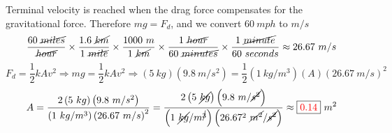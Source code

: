 \documentclass{article}
\begin{document}
\noindent
Terminal velocity is reached when the drag force compensates for the gravitational force. Therefore $mg=F_d$, and we convert $60 \ mph$ to $m/s$
	\[ \frac{60 \ \cancel{miles}}{ \cancel{hour}} \times \frac{1.6 \ \cancel{km}}{1 \ \cancel{mile}} \times \frac{1000 \ m}{1 \ \cancel{km}} \times \frac{1 \ \cancel{hour}}{60 \ \cancel{minutes}} \times \frac{1 \  \cancel{minute}}{60 \ seconds} \approx 26.67 \ m/s \]
	\[ F_d = \frac{1}{2} kAv^2 \Rightarrow mg = \frac{1}{2} kAv^2 \Rightarrow \left(5 \ kg \right) \left(9.8 \ m/s^2 \right) = \frac{1}{2} \left( 1 \ kg/m^3 \right) \left( A \right) {\left(26.67 \ m/s \right)}^2 \]
	\[ A = \frac{2 \left(5 \ kg \right) \left(9.8 \ m/s^2 \right)}{\left( 1 \ kg/m^3 \right)  {\left(26.67 \ m/s \right)}^2 } = \frac{2 \left(5 \ \cancel{kg} \right) \left(9.8 \ m/\cancel{s^2} \right)}{\left( 1 \ \cancel{kg}/m^{\cancel{3}} \right)  \left(26.67^2 \ \cancel{m^2}/\cancel{s^2} \right) } \approx \fbox{\textcolor{red}{0.14}} \ m^2  \]
	
\end{document}
